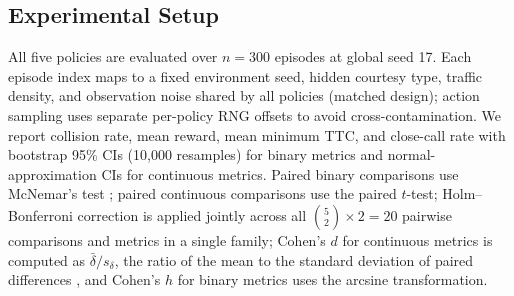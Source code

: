 \subsection{Experimental Setup}
\label{sec:experiments}
All five policies are evaluated over $n{=}300$ episodes at global seed 17.
Each episode index maps to a fixed environment seed, hidden courtesy type,
traffic density, and observation noise shared by all policies (matched
design); action sampling uses separate per-policy RNG offsets to avoid
cross-contamination.
We report collision rate, mean reward, mean minimum TTC, and close-call rate
with bootstrap 95\% CIs (10{,}000 resamples) for binary metrics and
normal-approximation CIs for continuous metrics.
Paired binary comparisons use McNemar's test \citep{mcnemar1947note};
paired continuous comparisons use the paired $t$-test; Holm--Bonferroni
correction \citep{holm1979simple} is applied jointly across all
$\binom{5}{2}{\times}2{=}20$ pairwise comparisons and metrics in a single
family; Cohen's $d$ for continuous metrics is computed as
$\bar\delta/s_\delta$, the ratio of the mean to the standard deviation of
paired differences \citep{cohen1988statistical}, and Cohen's $h$ for binary
metrics uses the arcsine transformation.










